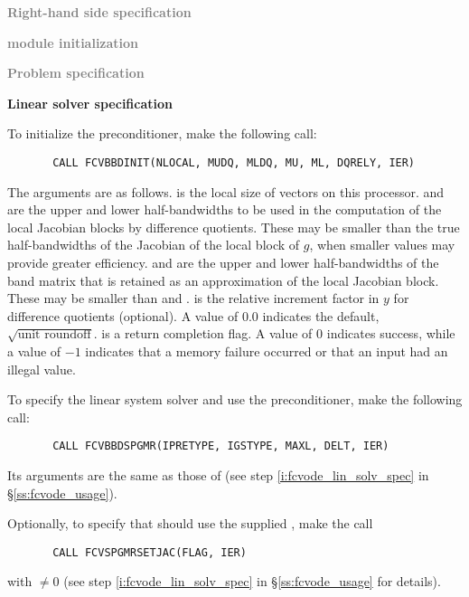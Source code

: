 \begin{Steps}
  
\item \textcolor{gray}{\bf Right-hand side specification}

\item \textcolor{gray}{\bf {\nvector} module initialization}

\item \textcolor{gray}{\bf Problem specification}

\item {\bf Linear solver specification}

  To initialize the {\cvbbdpre} preconditioner, make the following call:
\begin{verbatim}
       CALL FCVBBDINIT(NLOCAL, MUDQ, MLDQ, MU, ML, DQRELY, IER)
\end{verbatim}
  The arguments are as follows.
   is the local size of vectors on this processor.
   and  are the upper and lower half-bandwidths to be used in 
  the computation of the local Jacobian blocks by difference quotients.
  These may be smaller than the true half-bandwidths of the
  Jacobian of the local block of $g$, when smaller values may
  provide greater efficiency.
   and  are the upper and lower half-bandwidths of the band matrix
  that  is retained as an approximation of the local Jacobian block.
  These may be smaller than  and .
   is the relative increment factor in $y$ for difference quotients
  (optional).  A value of $0.0$ indicates the default, $\sqrt{\text{unit roundoff}}$.
   is a return completion flag.  A value of $0$ indicates success, while
  a value of $-1$ indicates that a memory failure occurred or that an input had
  an illegal value.
  
  To specify the {\spgmr} linear system solver and use the {\cvbbdpre}
  preconditioner, make the following call:
\begin{verbatim}
       CALL FCVBBDSPGMR(IPRETYPE, IGSTYPE, MAXL, DELT, IER)
\end{verbatim}
  Its arguments are the same as those of 
  (see step \ref{i:fcvode_lin_solv_spec} in \S\ref{ss:fcvode_usage}).
  

  Optionally, to specify that {\spgmr} should use the supplied , 
  make the call
\begin{verbatim}
       CALL FCVSPGMRSETJAC(FLAG, IER)
\end{verbatim}
  with  $\neq 0$ 
  (see step \ref{i:fcvode_lin_solv_spec} in \S\ref{ss:fcvode_usage} for details).
  

\end{Steps}
